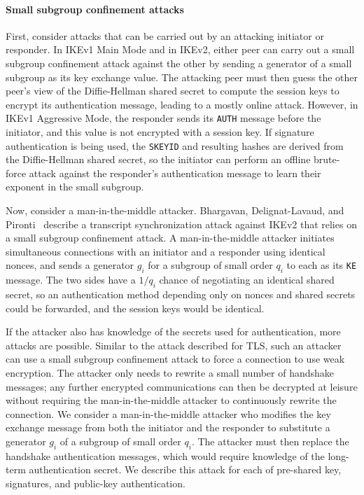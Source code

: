 \paragraph{Small subgroup confinement attacks} First, consider attacks that can
be carried out by an attacking initiator or responder. In IKEv1 Main Mode and
in IKEv2, either peer can carry out a small subgroup confinement attack against
the other by sending a generator of a small subgroup as its key exchange value.
The attacking peer must then guess the other peer's view of the Diffie-Hellman
shared secret to compute the session keys to encrypt its authentication
message, leading to a mostly online attack. However, in IKEv1 Aggressive Mode,
the responder sends its \texttt{AUTH} message before the initiator, and this
value is not encrypted with a session key. If signature authentication is being
used, the \texttt{SKEYID} and resulting hashes are derived from the
Diffie-Hellman shared secret, so the initiator can perform an offline
brute-force attack against the responder's authentication message to learn
their exponent in the small subgroup.

Now, consider a man-in-the-middle attacker. Bhargavan, Delignat-Lavaud, and
Pironti~\cite{bhargavan-channel-bindings-2015} describe a transcript synchronization
attack against IKEv2 that relies on a small subgroup confinement attack.  A
man-in-the-middle attacker initiates simultaneous connections with an initiator
and a responder using identical nonces, and sends a generator $g_i$ for a
subgroup of small order $q_i$ to each as its \texttt{KE} message.  The two
sides have a $1/q_i$ chance of negotiating an identical shared secret, so an
authentication method depending only on nonces and shared secrets could be
forwarded, and the session keys would be identical.

If the attacker also has knowledge of the secrets used for authentication, more
attacks are possible.  Similar to the attack described for TLS, such an
attacker can use a small subgroup confinement attack to force a connection to
use weak encryption. The attacker only needs to rewrite a small number of
handshake messages; any further encrypted communications can then be decrypted
at leisure without requiring the man-in-the-middle attacker to continuously
rewrite the connection. We consider a man-in-the-middle attacker who modifies
the key exchange message from both the initiator and the responder to
substitute a generator $g_i$ of a subgroup of small order $q_i$.  The attacker
must then replace the handshake authentication messages, which would require
knowledge of the long-term authentication secret.  We describe this attack for
each of pre-shared key, signatures, and public-key authentication. 

